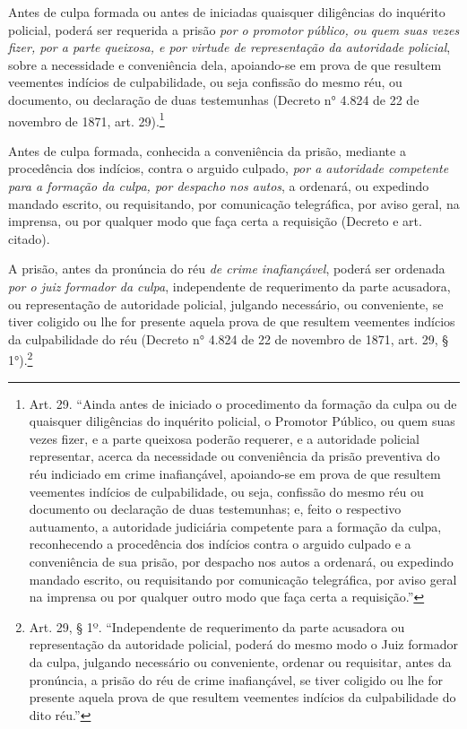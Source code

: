 Antes de culpa formada ou antes de iniciadas quaisquer diligências do
inquérito policial, poderá ser requerida a prisão \emph{por o promotor
público, ou quem suas vezes fizer, por a parte queixosa, e por virtude
de representação da autoridade policial}, sobre a necessidade e
conveniência dela, apoiando-se em prova de que resultem veementes
indícios de culpabilidade, ou seja confissão do mesmo réu, ou documento,
ou declaração de duas testemunhas (Decreto n° 4.824 de 22 de
novembro de 1871, art. 29).\footnote{Art. 29. ``Ainda antes de
  iniciado o procedimento da formação da culpa ou de quaisquer
  diligências do inquérito policial, o Promotor Público, ou quem suas
  vezes fizer, e a parte queixosa poderão requerer, e a autoridade
  policial representar, acerca da necessidade ou conveniência da prisão
  preventiva do réu indiciado em crime inafiançável, apoiando-se em
  prova de que resultem veementes indícios de culpabilidade, ou seja,
  confissão do mesmo réu ou documento ou declaração de duas testemunhas;
  e, feito o respectivo autuamento, a autoridade judiciária competente
  para a formação da culpa, reconhecendo a procedência dos indícios
  contra o arguido culpado e a conveniência de sua prisão, por despacho
  nos autos a ordenará, ou expedindo mandado escrito, ou requisitando
  por comunicação telegráfica, por aviso geral na imprensa ou por
  qualquer outro modo que faça certa a requisição.''}

Antes de culpa formada, conhecida a conveniência da prisão, mediante a
procedência dos indícios, contra o arguido culpado, \emph{por a
autoridade competente para a formação da culpa, por despacho nos autos},
a ordenará, ou expedindo mandado escrito, ou requisitando, por
comunicação telegráfica, por aviso geral, na imprensa, ou por qualquer
modo que faça certa a requisição (Decreto e art. citado).

A prisão, antes da pronúncia do réu \emph{de crime inafiançável}, poderá
ser ordenada \emph{por o juiz formador da culpa}, independente de
requerimento da parte acusadora, ou representação de autoridade
policial, julgando necessário, ou conveniente, se tiver coligido ou lhe
for presente aquela prova de que resultem veementes indícios da
culpabilidade do réu (Decreto n° 4.824 de 22 de novembro de 1871,
art. 29, § 1°).\footnote{Art. 29, § 1º. ``Independente de requerimento
  da parte acusadora ou representação da autoridade policial, poderá do
  mesmo modo o Juiz formador da culpa, julgando necessário ou
  conveniente, ordenar ou requisitar, antes da pronúncia, a prisão do
  réu de crime inafiançável, se tiver coligido ou lhe for presente
  aquela prova de que resultem veementes indícios da culpabilidade do
  dito réu.''}

